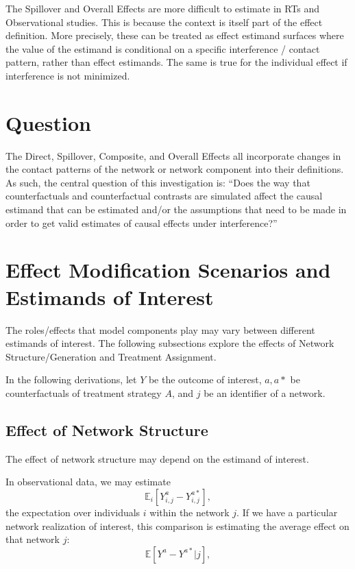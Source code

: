 \documentclass{article}
\theoremstyle{definition}
\begin{document}
The Spillover and Overall Effects are more difficult to estimate in RTs and Observational studies. This is because the context is itself part of the effect definition. More precisely, these can be treated as effect estimand surfaces where the value of the estimand is conditional on a specific interference / contact pattern, rather than effect estimands. The same is true for the individual effect if interference is not minimized.

\section{Question}
The Direct, Spillover, Composite, and Overall Effects all incorporate changes in the contact patterns of the network or network component into their definitions. As such, the central question of this investigation is: ``Does the way that counterfactuals and counterfactual contrasts are simulated affect the causal estimand that can be estimated and/or the assumptions that need to be made in order to get valid estimates of causal effects under interference?''

\section{Effect Modification Scenarios and Estimands of Interest}
The roles/effects that model components play may vary between different estimands of interest. The following subsections explore the effects of Network Structure/Generation and Treatment Assignment. 

In the following derivations, let $Y$ be the outcome of interest, $a,a*$ be counterfactuals of treatment strategy $A$, and $j$ be an identifier of a network.
\subsection{Effect of Network Structure}
The effect of network structure may depend on the estimand of interest. 

In observational data, we may estimate
\begin{equation}\label{eq:1}
    \mathbb{E}_{i}\left[Y_{i,j}^{a}-Y_{i,j}^{a*}\right],
\end{equation}
the expectation over individuals $i$ within the network $j$. If we have a particular network realization of interest, this comparison is estimating the average effect on that network $j$: 
\begin{equation}\label{eq:1}
    \mathbb{E}\left[Y^{a}-Y^{a*}|j\right],
\end{equation}
\end{document}
